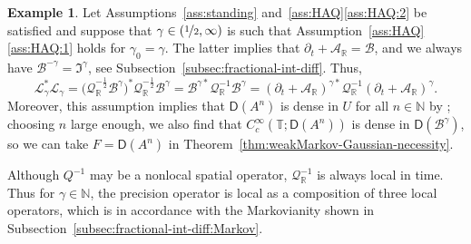 \documentclass[reqno]{amsart}
\numberwithin{equation}{section}
\newcommand{\bbR}{\mathbb{R}}
\newcommand{\bbT}{\mathbb{T}}
\newcommand{\N}{\mathbb{N}}
\newcommand{\cA}{\mathcal{A}}
\newcommand{\cB}{\mathcal{B}}
\newcommand{\cL}{\mathcal{L}}
\newcommand{\cQ}{\mathcal{Q}}
\newcommand{\dom}[1]{\mathsf D(#1)}
\theoremstyle{remark}
\theoremstyle{definition}
\newtheorem{example}[lemma]{Example}
\begin{document}
\begin{example}\label{ex:non-Markovianity}
	Let
	Assumptions~\textup{\ref{ass:standing} and~\ref{ass:HAQ}\ref{ass:HAQ:2}} be
	satisfied and suppose that $\gamma \in (\nicefrac{1}{2},\infty)$
	is such that Assumption~\textup{\ref{ass:HAQ}\ref{ass:HAQ:1}} 
	holds for $\gamma_0 = \gamma$.
	The latter implies that
	$\partial_t + \cA_\bbR = \cB$, and we always have
	$\cB^{-\gamma} = \mathfrak I^\gamma$, see Subsection~\ref{subsec:fractional-int-diff}. Thus,
	\[
	\cL_\gamma^* \cL_\gamma 
	=
	\bigl(\cQ_{\bbR}^{-\frac{1}{2}} \cB^{\gamma} \bigr)^* \cQ_{\bbR}^{-\frac{1}{2}} \cB^{\gamma} 
	=
	\cB^{\gamma*} \cQ_{\bbR}^{-1} \cB^{\gamma} 
	=
	(\partial_t + \cA_\bbR)^{\gamma*} \cQ_{\bbR}^{-1} (\partial_t + \cA_\bbR)^{\gamma}.
	\]
	Moreover, this assumption implies that $\dom{A^n}$ is dense in $U$ for all
	$n \in \N$ by \cite[Chapter~2, Theorem~6.8(c)]{Pazy1983}; choosing
	$n$ large enough, we also find that $C_c^\infty(\bbT; \dom{A^n})$ is dense in $\dom{\cB^\gamma}$,
	so we can take $F = \dom{A^n}$ in Theorem~\ref{thm:weakMarkov-Gaussian-necessity}.
	
	Although $Q^{-1}$ 
	may be a nonlocal spatial operator, $\cQ_\bbR^{-1}$ is always local in time.
	Thus for $\gamma \in \N$, the precision operator
	is local as a composition of three local operators, which is in accordance with
	the Markovianity shown in Subsection~\ref{subsec:fractional-int-diff:Markov}.
	

\end{example}
\end{document}
